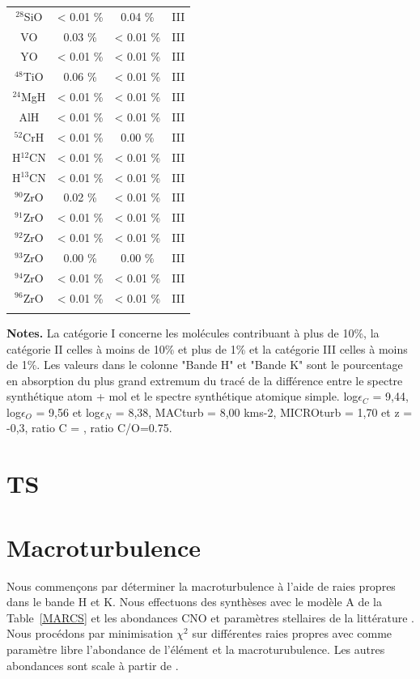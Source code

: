 \documentclass{article}
\begin{document}
\begin{table}[h!]
\begin{minipage}[t]{.4\linewidth}
\begin{center}
\begin{tabular}{cccc}
        $^{28}$SiO & < 0.01 \% & 0.04 \% & III\\
		VO &  0.03 \% &  < 0.01 \% & III\\
		YO & < 0.01 \% &  < 0.01 \%& III\\
		$^{48}$TiO &  0.06 \% &  < 0.01 \% & III\\
		$^{24}$MgH &  < 0.01 \% &  < 0.01 \% & III \\
		AlH &  < 0.01 \% &  < 0.01 \% & III \\
		$^{52}$CrH & < 0.01 \% & 0.00 \% & III\\
		H$^{12}$CN & < 0.01 \% & < 0.01 \% & III\\
		H$^{13}$CN &   < 0.01 \% & < 0.01 \% & III\\
		$^{90}$ZrO & 0.02  \% & < 0.01  \% & III\\
		$^{91}$ZrO &  < 0.01 \% &  < 0.01 \% & III\\
		$^{92}$ZrO & < 0.01 \% &  < 0.01 \% & III\\
		$^{93}$ZrO &  0.00 \% & 0.00 \% & III\\
		$^{94}$ZrO &  < 0.01 \% &  < 0.01 \% & III\\
		$^{96}$ZrO &  < 0.01 \% &  < 0.01 \% & III\\
		 &  &  \\
        \hline
    \end{tabular}
	\end{center}
\end{minipage}
\vspace{0.3cm}

\textbf{Notes.} La catégorie I concerne les molécules contribuant à plus de 10\%, la catégorie II celles à moins de 10\% et plus de 1\% et la catégorie III celles à moins de 1\%. Les valeurs dans le colonne "Bande H" et "Bande K" sont le pourcentage en absorption du plus grand extremum du tracé de la différence entre le spectre synthétique atom + mol et le spectre synthétique atomique simple. log$\epsilon_C$ = 9,44, log$\epsilon_O$ = 9,56 et log$\epsilon_N$ = 8,38, MACturb = 8,00 kms-2, MICROturb = 1,70 et z = -0,3, ratio C = , ratio C/O=0.75.
\label{contribution_mol}
\end{table}

\section{TS}

\section{Macroturbulence}
Nous commençons par déterminer la macroturbulence à l'aide de raies propres dans le bande H et K. Nous effectuons des synthèses avec le modèle A de la Table~\ref{MARCS} et les abondances CNO et paramètres stellaires de la littérature \cite{shetye_s_2018}. Nous procédons par minimisation $\chi^2$ sur différentes raies propres avec comme paramètre libre l'abondance de l'élément et la macroturubulence. 
Les autres abondances sont scale à partir de \cite{grevesse_solar_2007}.
\end{document}
